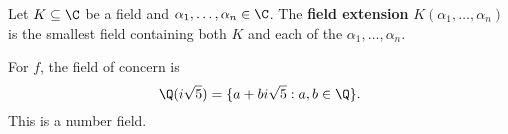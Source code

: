 \begin{definition}
    Let $K \subseteq \C$ be a field and $\alpha_1, \ldots, \alpha_n \in \C$. The \textbf{field extension} $K(\alpha_1, \ldots, \alpha_n)$ is the smallest field containing both $K$ and each of the $\alpha_1, \ldots, \alpha_n$.
\end{definition}

For $f$, the field of concern is
\begin{equation}
    \Q(i \sqrt 5) = \{ a  + b i \sqrt 5 : a, b \in \Q \}.
\end{equation}
This is a number field.

